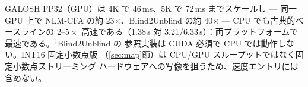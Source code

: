 \begin{table}[t]
\centering
\caption{\textbf{統制解像度の速度参考値}：1080p（1920$\times$1080 Bayer）、
CPU（1 コア）と GPU（NVIDIA RTX 4070\,Ti）。速度の\emph{主比較}は
表~\ref{tab:sidd_medium}--\ref{tab:rawnind} のフルサイズ画像あたり CPU/GPU 列で
ある。ウォーム実測。GALOSH GPU はカーネルパイプライン（context+build
$\sim$90\,ms は初回のみで償却）、他は end-to-end。}
\label{tab:speed}
\setlength{\tabcolsep}{8pt}

\vspace{2pt}
{\footnotesize GALOSH FP32（GPU）は 4K で 46\,ms、5K で 72\,ms までスケールし
--- 同一 GPU 上で NLM-CFA の約 23$\times$、Blind2Unblind の約 40$\times$ ---
CPU でも古典的ベースラインの $2$--$5\times$ 高速である（1.38\,s 対
3.21/6.33\,s）：両プラットフォームで最速である。$^{\dagger}$Blind2Unblind の
参照実装は CUDA 必須で CPU では動作しない。INT16 固定小数点版
（\ref{sec:map}節）は CPU/GPU スループットではなく固定小数点ストリーミング
ハードウェアへの写像を狙うため、速度エントリには含めない。}
\end{table}
